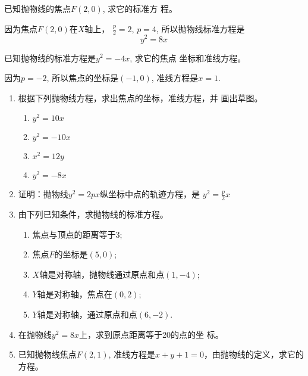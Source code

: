 \begin{example}
    已知抛物线的焦点$F(2,0)$, 求它的标准方
程。
\end{example}


\begin{solution}
    因为焦点$F(2,0)$在$X$轴上，
$\frac{p}{2}=2$, $p=4$, 
所以抛物线标准方程是
\[y^2=8x\]
\end{solution}



\begin{example}
    已知抛物线的标准方程是$y^2=-4x$, 求它的焦点
坐标和准线方程。
\end{example}

\begin{solution}
    因为$p=-2$, 所以焦点的坐标是$(-1,0)$, 
准线方程是$x=1$.
\end{solution}

\begin{ex}
\begin{enumerate}
    \item 根据下列抛物线方程，求出焦点的坐标，准线方程，并
    画出草图。
\begin{multicols}{2}
\begin{enumerate}
  \item $y^2=10x$  
\item $y^2=-10x$
\item $x^2=12y$  
\item $y^2=-8x$
\end{enumerate}
\end{multicols}

    \item 证明：抛物线$y^2=2px$纵坐标中点的轨迹方程，是
$y^2=\frac{p}{2}x$
    \item 由下列已知条件，求抛物线的标准方程。
\begin{enumerate}
\item 焦点与顶点的距离等于3;
\item 焦点$F$的坐标是$(5,0)$;
\item $X$轴是对称轴，抛物线通过原点和点$(1,-4)$;
\item $Y$轴是对称轴，焦点在$(0,2)$;
\item $Y$轴是对称轴，通过原点和点$(6,-2)$.
\end{enumerate}

    \item 在抛物线$y^2=8x$上，求到原点距离等于20的点的坐
    标。
    \item 已知抛物线焦点$F(2,1)$, 准线方程是$x+y+1=0$，由抛物线的定义，求它的方程。
\end{enumerate}
\end{ex}

